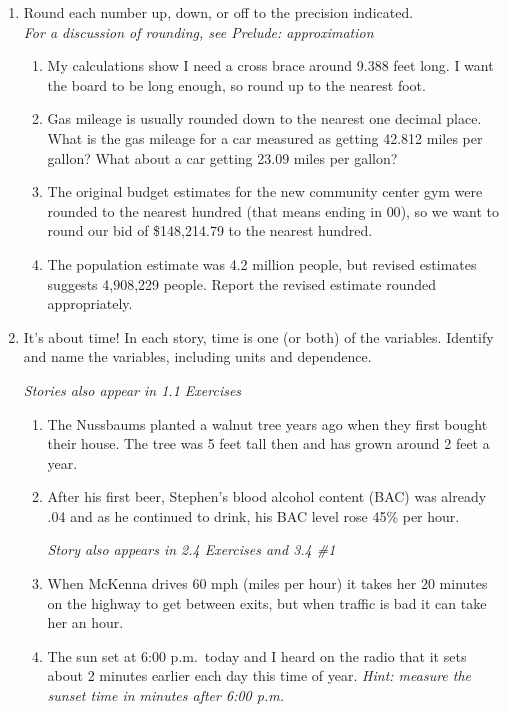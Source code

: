 \begin{enumerate}
\item  Round each number up, down, or off to the precision indicated. \\  \emph{For a discussion of rounding, see Prelude:  approximation}
\begin{enumerate}
\item My calculations show I need a cross brace around 9.388 feet long. I want the board to be long enough, so round up to the nearest foot. \vfill
\item  Gas mileage is usually rounded down to the nearest one decimal place.  What is the gas mileage for a car measured as getting 42.812 miles per gallon?  What about a car getting 23.09 miles per gallon? \vfill
\item  The original budget estimates for the new community center gym were rounded to the nearest hundred (that means ending in $00$), so we want to round our bid of \$148,214.79 to the nearest hundred.   \vfill
\item The population estimate was 4.2 million people, but revised estimates suggests 4,908,229 people.  Report the revised estimate rounded appropriately. \vfill
\end{enumerate}

\newpage %

\item  It's about time!  In each story, time is one (or both) of the variables.  Identify and name the variables, including units and dependence.  

\hfill \emph{Stories also appear in 1.1 Exercises}
\begin{enumerate}
\item The Nussbaums planted a walnut tree years ago when they first bought their house.  The tree was 5 feet tall then and has grown around 2 feet a year. \vfill
\item After his first beer, Stephen's blood alcohol content (BAC) was already .04 and as he continued to drink, his BAC level rose 45\% per hour. 

\hfill \emph{Story also appears in 2.4 Exercises and 3.4 \#1} 
 \vfill
\item When McKenna drives 60 mph (miles per hour) it takes her 20 minutes on the highway to get between exits, but when traffic is bad it can take her an hour.\vfill
\item The sun set at 6:00 p.m.\ today and I heard on the radio that it sets about 2 minutes earlier each day this time of year.  \emph{Hint: measure the sunset time in minutes after 6:00 p.m.}\vfill
\end{enumerate} 

\end{enumerate}



